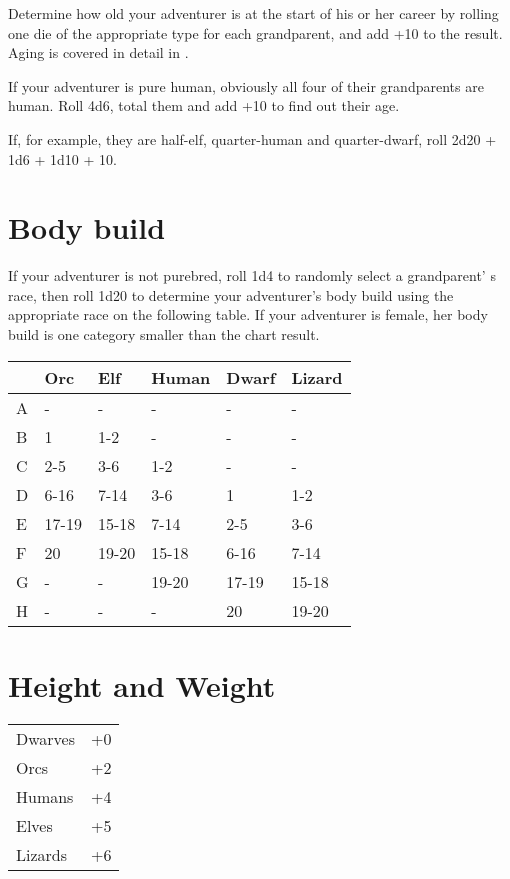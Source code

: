 Determine how old your adventurer is at the start of his or her career by rolling one die of the appropriate type for each grandparent, and add +10 to the result. Aging is covered in detail in .

If your adventurer is pure human, obviously all four of their grandparents are human. Roll 4d6, total them and add +10 to find out their age.

If, for example, they are half-elf, quarter-human and quarter-dwarf, roll 2d20 + 1d6 + 1d10 + 10.

\section{Body build}

If your adventurer is not purebred, roll 1d4 to randomly select a grandparent' s race, then roll 1d20 to determine your adventurer's body build using the appropriate race on the following table. If your adventurer is female, her body build is one category smaller than the chart result.
\begin{normbox}
\small
\begin{tabular}{@{} l l l l l l }
 & \textbf{Orc} & \textbf{Elf} & \textbf{Human} & \textbf{Dwarf} & \textbf{Lizard}\\
\midrule
A & - & - & - & - & -\\
B & 1 & 1-2 & - & - & -\\
C & 2-5 & 3-6 & 1-2 & - & -\\
D & 6-16 & 7-14 & 3-6 & 1 & 1-2\\
E & 17-19 & 15-18 & 7-14 & 2-5 & 3-6\\
F & 20 & 19-20 & 15-18 & 6-16 & 7-14\\
G & - & - & 19-20 & 17-19 & 15-18\\
H & - & - & - & 20 & 19-20
\end{tabular}
\end{normbox}

\section{Height and Weight}

\begin{normbox}
\small

\begin{tabular}{@{}l l}
Dwarves & +0\\
Orcs & +2\\
Humans & +4\\
Elves & +5\\
Lizards & +6\\
\end{tabular}
\end{normbox}

